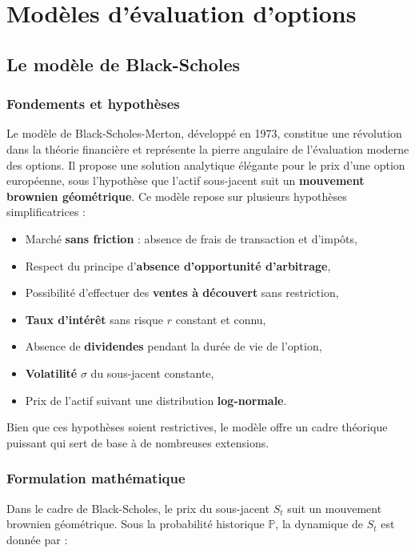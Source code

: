 \chapter{Modèles d'évaluation d'options}
\label{sec:modeles}

\section{Le modèle de Black-Scholes}
\subsection{Fondements et hypothèses}

Le modèle de Black-Scholes-Merton, développé en 1973, constitue une révolution dans la théorie financière et représente la pierre angulaire de l'évaluation moderne des options. Il propose une solution analytique élégante pour le prix d'une option européenne, sous l'hypothèse que l'actif sous-jacent suit un \textbf{mouvement brownien géométrique}. Ce modèle repose sur plusieurs hypothèses simplificatrices :

\begin{itemize}
	\item Marché \textbf{sans friction} : absence de frais de transaction et d'impôts,
	\item Respect du principe d'\textbf{absence d'opportunité d'arbitrage},
	\item Possibilité d'effectuer des \textbf{ventes à découvert} sans restriction,
	\item \textbf{Taux d'intérêt} sans risque $r$ constant et connu,
	\item Absence de \textbf{dividendes} pendant la durée de vie de l'option,
	\item \textbf{Volatilité} $\sigma$ du sous-jacent constante,
	\item Prix de l'actif suivant une distribution \textbf{log-normale}.
\end{itemize}

Bien que ces hypothèses soient restrictives, le modèle offre un cadre théorique puissant qui sert de base à de nombreuses extensions.

\subsection{Formulation mathématique}

Dans le cadre de Black-Scholes, le prix du sous-jacent $S_t$ suit un mouvement brownien géométrique. Sous la probabilité historique $\mathbb{P}$, la dynamique de $S_t$ est donnée par :

